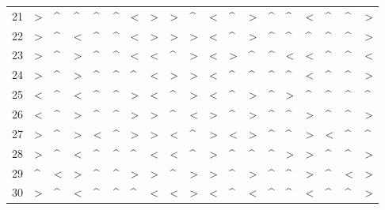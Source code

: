 \begin{tabular}{lllllllllllllllllll}
21  &  > &  \textasciicircum  &  \textasciicircum  &  \textasciicircum  &  \textasciicircum  &  < &  > &  > &  \textasciicircum  &  < &  \textasciicircum  &  > &  \textasciicircum  &  \textasciicircum  &  < &  \textasciicircum  &  \textasciicircum  &  > \\
22  &  > &  \textasciicircum  &  < &  \textasciicircum  &  \textasciicircum  &  < &  > &  > &  > &  < &  \textasciicircum  &  > &  \textasciicircum  &  \textasciicircum  &  \textasciicircum  &  \textasciicircum  &  \textasciicircum  &  > \\
23  &  > &  \textasciicircum  &  > &  \textasciicircum  &  \textasciicircum  &  < &  < &  \textasciicircum  &  > &  < &  > &  \textasciicircum  &  \textasciicircum  &  < &  < &  \textasciicircum  &  \textasciicircum  &  < \\
24  &  > &  \textasciicircum  &  > &  \textasciicircum  &  \textasciicircum  &  \textasciicircum  &  < &  > &  > &  < &  \textasciicircum  &  \textasciicircum  &  \textasciicircum  &  \textasciicircum  &  < &  \textasciicircum  &  \textasciicircum  &  > \\
25  &  < &  \textasciicircum  &  < &  \textasciicircum  &  \textasciicircum  &  > &  < &  \textasciicircum  &  > &  < &  \textasciicircum  &  > &  \textasciicircum  &  > &  \textasciicircum  &  \textasciicircum  &  \textasciicircum  &  \textasciicircum  \\
26  &  < &  \textasciicircum  &  > &  \textasciicircum  &  \textasciicircum  &  > &  > &  \textasciicircum  &  < &  > &  \textasciicircum  &  > &  \textasciicircum  &  \textasciicircum  &  > &  \textasciicircum  &  \textasciicircum  &  > \\
27  &  > &  \textasciicircum  &  > &  < &  \textasciicircum  &  > &  > &  < &  \textasciicircum  &  > &  < &  > &  \textasciicircum  &  \textasciicircum  &  > &  < &  \textasciicircum  &  \textasciicircum  \\
28  &  > &  \textasciicircum  &  < &  \textasciicircum  &  \textasciicircum  &  \textasciicircum  &  < &  < &  \textasciicircum  &  > &  \textasciicircum  &  \textasciicircum  &  \textasciicircum  &  > &  > &  \textasciicircum  &  \textasciicircum  &  > \\
29  &  \textasciicircum  &  < &  > &  \textasciicircum  &  \textasciicircum  &  > &  > &  \textasciicircum  &  > &  > &  \textasciicircum  &  > &  \textasciicircum  &  \textasciicircum  &  > &  \textasciicircum  &  < &  > \\
30  &  > &  \textasciicircum  &  < &  \textasciicircum  &  \textasciicircum  &  \textasciicircum  &  < &  < &  > &  < &  \textasciicircum  &  < &  \textasciicircum  &  \textasciicircum  &  < &  \textasciicircum  &  \textasciicircum  &  > \\

\end{tabular}
